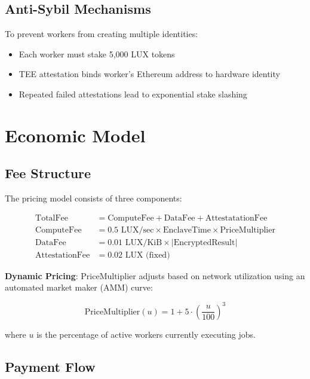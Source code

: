 \documentclass[11pt,letterpaper]{article}
\begin{document}
\subsection{Anti-Sybil Mechanisms}

To prevent workers from creating multiple identities:

\begin{itemize}
  \item Each worker must stake 5,000 LUX tokens
  \item TEE attestation binds worker's Ethereum address to hardware identity
  \item Repeated failed attestations lead to exponential stake slashing
\end{itemize}

\section{Economic Model}
\label{sec:economics}

\subsection{Fee Structure}

The pricing model consists of three components:

\begin{align}
\text{TotalFee} &= \text{ComputeFee} + \text{DataFee} + \text{AttestatationFee} \\
\text{ComputeFee} &= 0.5 \text{ LUX/sec} \times \text{EnclaveTime} \times \text{PriceMultiplier} \\
\text{DataFee} &= 0.01 \text{ LUX/KiB} \times |\text{EncryptedResult}| \\
\text{AttestationFee} &= 0.02 \text{ LUX (fixed)}
\end{align}

\textbf{Dynamic Pricing}: $\text{PriceMultiplier}$ adjusts based on network utilization using an automated market maker (AMM) curve:

\begin{equation}
\text{PriceMultiplier}(u) = 1 + 5 \cdot \left(\frac{u}{100}\right)^3
\end{equation}

where $u$ is the percentage of active workers currently executing jobs.

\subsection{Payment Flow}
\end{document}
